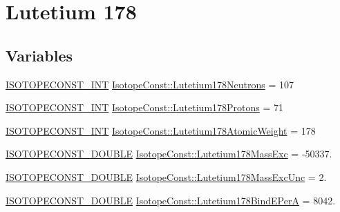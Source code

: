 \hypertarget{group___isotope_const-_lutetium-_lu178}{}\section{Lutetium 178}
\label{group___isotope_const-_lutetium-_lu178}
\subsection*{Variables}
\begin{DoxyCompactItemize}
\item 
\mbox{\hyperlink{group___isotope_const-_macros_ga5f18360b3e99483a35c32d789e62621c}{I\+S\+O\+T\+O\+P\+E\+C\+O\+N\+S\+T\+\_\+\+I\+NT}} \mbox{\hyperlink{group___isotope_const-_lutetium-_lu178_ga62cc9164881a51a7fb6547b852a58ef6}{Isotope\+Const\+::\+Lutetium178\+Neutrons}} = 107
\item 
\mbox{\hyperlink{group___isotope_const-_macros_ga5f18360b3e99483a35c32d789e62621c}{I\+S\+O\+T\+O\+P\+E\+C\+O\+N\+S\+T\+\_\+\+I\+NT}} \mbox{\hyperlink{group___isotope_const-_lutetium-_lu178_ga4bbc05bcae28705e982bfe71bfeaea82}{Isotope\+Const\+::\+Lutetium178\+Protons}} = 71
\item 
\mbox{\hyperlink{group___isotope_const-_macros_ga5f18360b3e99483a35c32d789e62621c}{I\+S\+O\+T\+O\+P\+E\+C\+O\+N\+S\+T\+\_\+\+I\+NT}} \mbox{\hyperlink{group___isotope_const-_lutetium-_lu178_gadbc6fc0bc04451ffd50d240582ad3315}{Isotope\+Const\+::\+Lutetium178\+Atomic\+Weight}} = 178
\item 
\mbox{\hyperlink{group___isotope_const-_macros_ga8f45a7272ce02c0b4c65c44636ed719a}{I\+S\+O\+T\+O\+P\+E\+C\+O\+N\+S\+T\+\_\+\+D\+O\+U\+B\+LE}} \mbox{\hyperlink{group___isotope_const-_lutetium-_lu178_gac4fcfbc633587a20287025cc5021f34a}{Isotope\+Const\+::\+Lutetium178\+Mass\+Exc}} = -\/50337.
\item 
\mbox{\hyperlink{group___isotope_const-_macros_ga8f45a7272ce02c0b4c65c44636ed719a}{I\+S\+O\+T\+O\+P\+E\+C\+O\+N\+S\+T\+\_\+\+D\+O\+U\+B\+LE}} \mbox{\hyperlink{group___isotope_const-_lutetium-_lu178_ga632e604372ed8d9be62685b24d06b56f}{Isotope\+Const\+::\+Lutetium178\+Mass\+Exc\+Unc}} = 2.
\item 
\mbox{\hyperlink{group___isotope_const-_macros_ga8f45a7272ce02c0b4c65c44636ed719a}{I\+S\+O\+T\+O\+P\+E\+C\+O\+N\+S\+T\+\_\+\+D\+O\+U\+B\+LE}} \mbox{\hyperlink{group___isotope_const-_lutetium-_lu178_ga0c23d410a4ea267cc2fa2f23b1557e84}{Isotope\+Const\+::\+Lutetium178\+Bind\+E\+PerA}} = 8042.
\item 

\end{DoxyCompactItemize}
